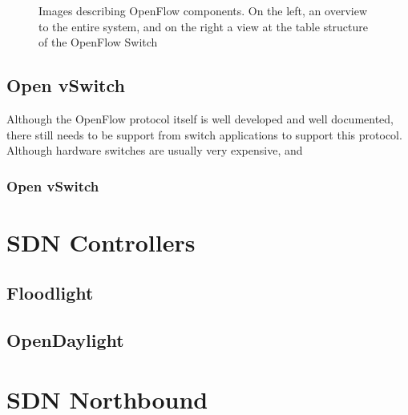 \begin{figure} [h]
    \begin{subfigure}
    \texttt{[image: sdn/open\_flow\_switch\_pipeline]}
    \end{subfigure}
    \begin{subfigure}
    \texttt{[image: sdn/open\_flow\_tables]}
    \end{subfigure}
\caption{Images describing OpenFlow components. On the left, an overview to the entire system, and on the right a view at the table structure of the OpenFlow Switch}
\end{figure}

\subsection {Open vSwitch}

\par Although the OpenFlow protocol itself is well developed and well documented, there still needs to be support from switch applications to support this protocol. Although hardware switches are usually very expensive, and 

\subsubsection {Open vSwitch}


\section {SDN Controllers}
\subsection {Floodlight}
\subsection {OpenDaylight}
\section {SDN Northbound}
